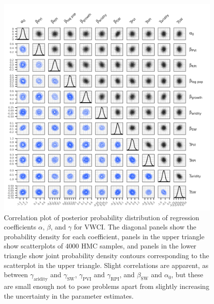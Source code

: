 \documentclass[draft]{agujournal}
\begin{document}
\begin{figure}
\includegraphics[width=6.25in]{figures_si/vwci_pairs_plot-1} \caption[Correlation plot of posterior probability distribution of regression coefficients $\alpha$, $\beta$, and $\gamma$ for VWCI]{Correlation plot of posterior probability distribution of regression coefficients $\alpha$, $\beta$, and $\gamma$ for VWCI. The diagonal panels show the probability density for each coefficient, panels in the upper triangle show scatterplots of 4000 HMC samples, and panels in the lower triangle show joint probability density contours corresponding to the scatterplot in the upper triangle. Slight correlations are apparent, as between $\gamma_{\text{aridity}}$ and $\gamma_{\text{SW}}$, $\gamma_{\text{PVI}}$ and $\gamma_{\text{RPI}}$, and $\beta_{\text{SW}}$ and $\alpha_0$, but these are small enough not to pose problems apart from slightly increasing the uncertainty in the parameter estimates.}\label{fig:vwci_pairs_plot}
\end{figure}



\end{document}
